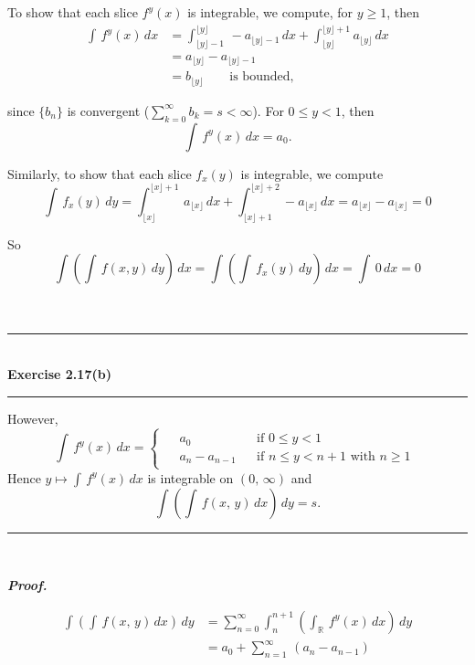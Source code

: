 \documentclass[a4paper,11pt]{article}
\begin{document}
To show that each slice $f^y(x)$ is integrable, we compute, for $y \geq 1$, then
	$$\begin{aligned}
	\int\,f^y(x)\,dx
	&= \int_{\lfloor y \rfloor - 1}^{\lfloor y \rfloor}\,-a_{\lfloor y \rfloor - 1}\,dx + \int_{\lfloor y \rfloor}^{\lfloor y \rfloor + 1}a_{\lfloor y \rfloor}\,dx\\
	&= a_{\lfloor y \rfloor} - a_{\lfloor y \rfloor - 1}\\
	&= b_{\lfloor y \rfloor} \quad \quad\text{is bounded,}
	\end{aligned}$$

since $\{b_n\}$ is convergent ($\sum_{k = 0}^\infty b_k = s < \infty$). For $0 \leq y < 1$, then
	$$\int\,f^y(x)\,dx = a_0.$$

Similarly, to show that each slice $f_x(y)$ is integrable, we compute
	$$\int\,f_x(y)\,dy
	= \int_{\lfloor x \rfloor}^{\lfloor x \rfloor + 1}\,a_{\lfloor x \rfloor}\,dx + \int_{\lfloor x \rfloor + 1}^{\lfloor x \rfloor + 2}-a_{\lfloor x \rfloor}\,dx
	= a_{\lfloor x \rfloor} - a_{\lfloor x \rfloor}
	= 0$$

So
	$$\int \left(\int\,f(x,y)\,dy\right)\,dx
	= \int \left(\int\,f_x(y)\,dy\right)\,dx
	= \int\,0\,dx
	= 0$$\\\\


\begin{flushleft}
	\rule[-0.5ex]{17cm}{2pt}\\
		\textbf{Exercise 2.17(b)}\\
	\rule[1.5ex]{17cm}{0.5pt}
		However,
			$$\int\,f^y(x)\,dx
			= \left\{ \begin{matrix} \begin{aligned}
			&a_0 &&\text{if }0 \leq y < 1\\
			&a_n - a_{n - 1} &&\text{if }n \leq y < n + 1\text{ with }n \geq 1
			\end{aligned}\end{matrix}\right.$$
		Hence $y \mapsto \int\,f^y(x)\,dx$ is integrable on $(0,\,\infty)$ and
			$$\int\left(\int\,f(x,\,y)\,dx\right)\,dy = s.$$
	\rule[1.0ex]{17cm}{0.5pt}\
\end{flushleft}

\textbf{\textit{Proof.}}

	$$\begin{aligned}
	\int\left(\int\,f(x,\,y)\,dx\right)\,dy
	&= \sum_{n = 0}^\infty \int_{n}^{n + 1}\left(\int_{\mathbb{R}}\,f^y(x)\,dx\right)\,dy\\
	&= a_0 + \sum_{n = 1}^\infty\,(a_n - a_{n-1})\\\\
	\end{aligned}$$
\end{document}

